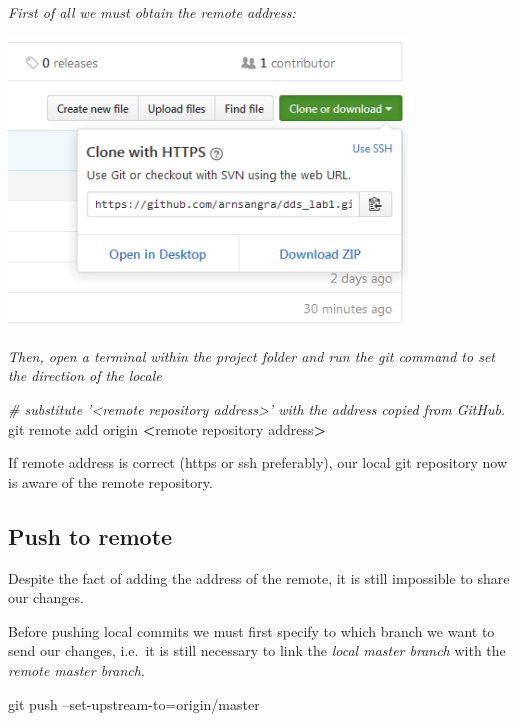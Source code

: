 \documentclass[]{article}
\newenvironment{Shaded}{\begin{snugshade}}{\end{snugshade}}
\newcommand{\CommentTok}[1]{\textcolor[rgb]{0.56,0.35,0.01}{\textit{#1}}}
\newcommand{\FunctionTok}[1]{\textcolor[rgb]{0.00,0.00,0.00}{#1}}
\newcommand{\OperatorTok}[1]{\textcolor[rgb]{0.81,0.36,0.00}{\textbf{#1}}}
\newcommand{\NormalTok}[1]{#1}
\begin{document}
\emph{First of all we must obtain the remote address:}

\begin{center}\includegraphics[width=400px]{figures/remote_address} \end{center}

\emph{Then, open a terminal within the project folder and run the git
command to set the direction of the locale}

\begin{Shaded}
\begin{Highlighting}[]
\CommentTok{# substitute '<remote repository address>' with the address copied from GitHub.}
\FunctionTok{git}\NormalTok{ remote add origin }\OperatorTok{<}\NormalTok{remote repository address}\OperatorTok{>}
\end{Highlighting}
\end{Shaded}

If remote address is correct (https or ssh preferably), our local git
repository now is aware of the remote repository.

\subsection{Push to remote}\label{push-to-remote}

Despite the fact of adding the address of the remote, it is still
impossible to share our changes.

Before pushing local commits we must first specify to which branch we
want to send our changes, i.e.~it is still necessary to link the
\emph{local master branch} with the \emph{remote master branch}.

\begin{Shaded}
\begin{Highlighting}[]
\FunctionTok{git}\NormalTok{ push --set-upstream-to=origin/master}
\end{Highlighting}
\end{Shaded}
\end{document}
